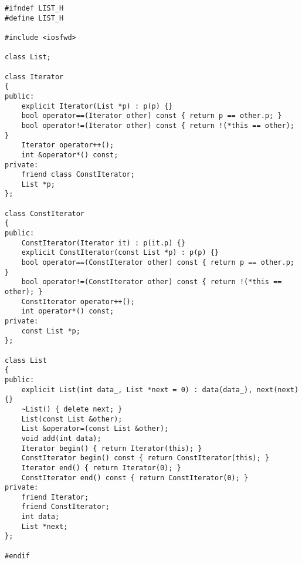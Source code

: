 \documentclass[a4paper,11.5pt]{article}
\begin{document}
	\medskip
\begin{lstlisting}
#ifndef LIST_H
#define LIST_H

#include <iosfwd>

class List;

class Iterator 
{
public:
	explicit Iterator(List *p) : p(p) {}
	bool operator==(Iterator other) const { return p == other.p; }
	bool operator!=(Iterator other) const { return !(*this == other); }
	Iterator operator++();
	int &operator*() const;
private:
	friend class ConstIterator;
	List *p;
};

class ConstIterator
{
public:
	ConstIterator(Iterator it) : p(it.p) {}
	explicit ConstIterator(const List *p) : p(p) {}
	bool operator==(ConstIterator other) const { return p == other.p; }
	bool operator!=(ConstIterator other) const { return !(*this == other); }
	ConstIterator operator++();
	int operator*() const;
private:
	const List *p;
};

class List 
{
public:
	explicit List(int data_, List *next = 0) : data(data_), next(next) {}
	~List() { delete next; }
	List(const List &other);
	List &operator=(const List &other);
	void add(int data);
	Iterator begin() { return Iterator(this); }
	ConstIterator begin() const { return ConstIterator(this); }
	Iterator end() { return Iterator(0); }
	ConstIterator end() const { return ConstIterator(0); }
private:
	friend Iterator;
	friend ConstIterator;
	int data;
	List *next;
};

#endif
\end{lstlisting}
\end{document}
